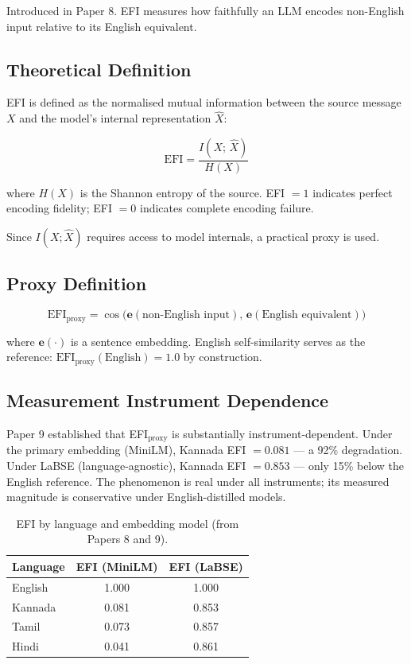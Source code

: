 \documentclass[11pt,a4paper]{article}
\begin{document}
Introduced in Paper 8. EFI measures how faithfully an LLM encodes non-English input
relative to its English equivalent.

\subsection{Theoretical Definition}

EFI is defined as the normalised mutual information between the source message $X$
and the model's internal representation $\hat{X}$:

\begin{equation}
    \text{EFI} = \frac{I(X;\, \hat{X})}{H(X)}
\end{equation}

where $H(X)$ is the Shannon entropy of the source. EFI $= 1$ indicates perfect
encoding fidelity; EFI $= 0$ indicates complete encoding failure.

Since $I(X; \hat{X})$ requires access to model internals, a practical proxy is used.

\subsection{Proxy Definition}

\begin{equation}
    \text{EFI}_{\text{proxy}} = \cos\!\big(\mathbf{e}(\text{non-English input}),\,
    \mathbf{e}(\text{English equivalent})\big)
\end{equation}

where $\mathbf{e}(\cdot)$ is a sentence embedding. English self-similarity serves as
the reference: $\text{EFI}_{\text{proxy}}(\text{English}) = 1.0$ by construction.

\subsection{Measurement Instrument Dependence}

Paper 9 established that EFI$_{\text{proxy}}$ is substantially instrument-dependent.
Under the primary embedding (MiniLM), Kannada EFI $= 0.081$ --- a 92\% degradation.
Under LaBSE (language-agnostic), Kannada EFI $= 0.853$ --- only 15\% below the
English reference. The phenomenon is real under all instruments; its measured
magnitude is conservative under English-distilled models.

\begin{table}[H]
\centering
\begin{tabular}{lcc}
\toprule
\textbf{Language} & \textbf{EFI (MiniLM)} & \textbf{EFI (LaBSE)} \\
\midrule
English  & 1.000 & 1.000 \\
Kannada  & 0.081 & 0.853 \\
Tamil    & 0.073 & 0.857 \\
Hindi    & 0.041 & 0.861 \\
\bottomrule
\end{tabular}
\caption{EFI by language and embedding model (from Papers 8 and 9).}
\end{table}
\end{document}

